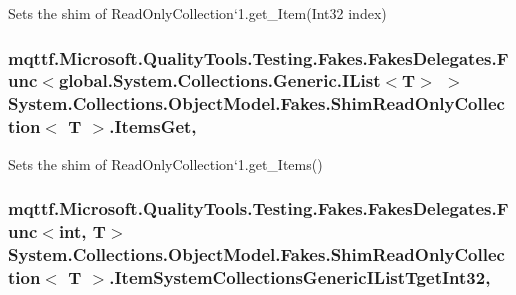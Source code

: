 Sets the shim of Read\-Only\-Collection`1.get\-\_\-\-Item(\-Int32 index)

\hypertarget{class_system_1_1_collections_1_1_object_model_1_1_fakes_1_1_shim_read_only_collection_3_01_t_01_4_aee6a18d71bd9960625d6a45b35925bd1}{
\subsubsection[{Items\-Get}]{\setlength{\rightskip}{0pt plus 5cm}mqttf.\-Microsoft.\-Quality\-Tools.\-Testing.\-Fakes.\-Fakes\-Delegates.\-Func$<$global.\-System.\-Collections.\-Generic.\-I\-List$<$T$>$ $>$ System.\-Collections.\-Object\-Model.\-Fakes.\-Shim\-Read\-Only\-Collection$<$ T $>$.Items\-Get\hspace{0.3cm}{\ttfamily [get]}, {\ttfamily [set]}}}\label{class_system_1_1_collections_1_1_object_model_1_1_fakes_1_1_shim_read_only_collection_3_01_t_01_4_aee6a18d71bd9960625d6a45b35925bd1}


Sets the shim of Read\-Only\-Collection`1.get\-\_\-\-Items()

\hypertarget{class_system_1_1_collections_1_1_object_model_1_1_fakes_1_1_shim_read_only_collection_3_01_t_01_4_a68f870bdbe84769a6cd28f071bc72b6a}{
\subsubsection[{Item\-System\-Collections\-Generic\-I\-List\-Tget\-Int32}]{\setlength{\rightskip}{0pt plus 5cm}mqttf.\-Microsoft.\-Quality\-Tools.\-Testing.\-Fakes.\-Fakes\-Delegates.\-Func$<$int, T$>$ System.\-Collections.\-Object\-Model.\-Fakes.\-Shim\-Read\-Only\-Collection$<$ T $>$.Item\-System\-Collections\-Generic\-I\-List\-Tget\-Int32\hspace{0.3cm}{\ttfamily [get]}, {\ttfamily [set]}}}\label{class_system_1_1_collections_1_1_object_model_1_1_fakes_1_1_shim_read_only_collection_3_01_t_01_4_a68f870bdbe84769a6cd28f071bc72b6a}


